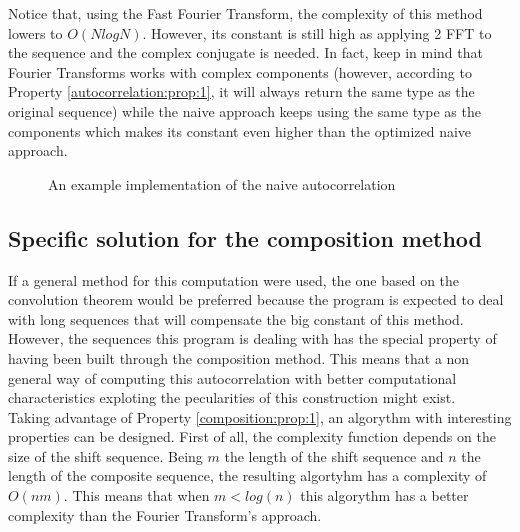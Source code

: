         Notice that, using the Fast Fourier
        Transform\cite{fast_fourier_transform}, the complexity of this
        method lowers to $O(N log N)$. However, its constant is
        still high as applying 2 FFT to the sequence and the
        complex conjugate is needed. In fact, keep in mind that Fourier
        Transforms works with complex components (however, according to
        Property \ref{autocorrelation:prop:1}, it will always return
        the same type as the original sequence) while the naive approach keeps
        using the same type as the components which makes its constant even higher
        than the optimized naive approach.

          \begin{figure}
            \caption{An example implementation of the naive autocorrelation}
            \label{naive_auto:fig:1}
          \end{figure}

      \subsection{Specific solution for the composition method}

      If a general method for this computation were used, the one based on the
      convolution theorem would be preferred because the program is
      expected to deal with long sequences that will compensate the big constant
      of this method.\\

      However, the sequences this program is dealing with has the special property
      of having been built through the composition method. This means that a non
      general way of computing this autocorrelation with better
      computational characteristics exploting the pecularities of this
      construction might exist.\\

      Taking advantage of Property \ref{composition:prop:1}, an algorythm with
      interesting properties can be designed. First of all, the complexity
      function depends on the size of the shift sequence. Being $m$ the
      length of the shift sequence and $n$ the length of the composite
      sequence, the resulting algortyhm has a complexity of $O(nm)$. This means
      that when $m < log(n)$ this algorythm has a better complexity than the
      Fourier Transform's approach.\\

